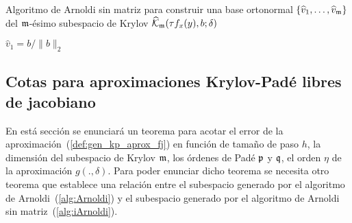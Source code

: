 {\SetAlgoNoLine
	\begin{algorithm}
		\caption{\cite{brown1987local} Algoritmo de Arnoldi sin matriz para construir una base ortonormal $\{\widehat{v}_1,\ldots,\widehat{v}_{\mathfrak{m}} \}$ 
			del $\mathfrak{m}$-ésimo subespacio de Krylov $\widehat{\mathcal{K}}_{\mathfrak{m}}(\tau f_x(y),b;\delta)$}
		\label{alg:iArnoldi}
		$\widehat{v}_1=b/\lVert b \rVert_2$\\
	\end{algorithm}
}

 \subsection{Cotas para aproximaciones Krylov-Padé libres de jacobiano}
  En está sección se enunciará un teorema para acotar el error de la aproximación~(\ref{def:gen_kp_aprox_fj}) en función de tamaño de paso $h$, la dimensión del subespacio de Krylov $\mathfrak{m}$, los órdenes de Padé $\mathfrak{p}$ y $\mathfrak{q}$, el orden $\eta$ de la aproximación $g(.,\delta)$. Para poder enunciar dicho teorema se necesita otro teorema que establece una relación entre el subespacio generado por el algoritmo de Arnoldi~(\ref{alg:Arnoldi}) y el subespacio generado por el algoritmo de Arnoldi sin matriz~(\ref{alg:iArnoldi}).

